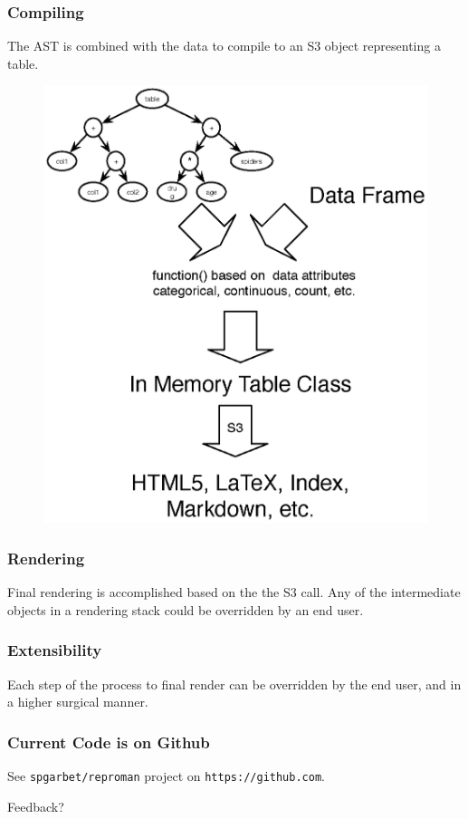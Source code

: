\documentclass{beamer}
\begin{document}
  \begin{frame}
    \frametitle{Compiling}
    The AST is combined with the data to compile to an S3 object representing a table.
    \begin{figure}
      \includegraphics[scale=0.33]{compiler.eps}
    \end{figure}
  \end{frame}      

  \begin{frame}
    \frametitle{Rendering}
    Final rendering is accomplished based on the the S3 call. Any of the intermediate objects in a rendering stack could be overridden by an end user.
  \end{frame}      

  \begin{frame}
    \frametitle{Extensibility}
    Each step of the process to final render can be overridden by the end user, and in a higher surgical manner.
  \end{frame}

  \begin{frame}
    \frametitle{Current Code is on Github}
    See \texttt{spgarbet/reproman} project on \texttt{https://github.com}.


    Feedback?
  \end{frame}
\end{document}
